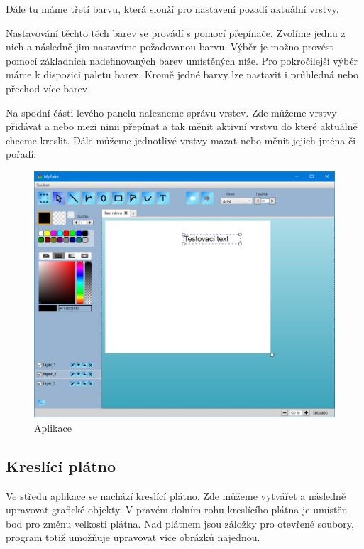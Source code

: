 \documentclass[
  field=inf,
  biblatex,
  glossaries,
  index
]{kidiplom}
\begin{document}
Dále tu máme třetí barvu, která slouží pro nastavení pozadí aktuální vrstvy.

Nastavování těchto těch barev se provádí s pomocí přepínače. Zvolíme jednu z nich a následně jim nastavíme požadovanou barvu. Výběr je možno provést pomocí základních nadefinovaných barev umístěných níže. Pro pokročilejší výběr máme k dispozici paletu barev. Kromě jedné barvy lze nastavit i průhledná nebo přechod více barev.

Na spodní části levého panelu nalezneme správu vrstev. Zde můžeme vrstvy přidávat a nebo mezi nimi přepínat a tak měnit aktivní vrstvu do které aktuálně chceme kreslit. Dále můžeme jednotlivé vrstvy mazat nebo měnit jejich jména či pořadí.

\begin{figure}
\includegraphics[width=15cm]{img/program}
\caption{Aplikace}
\end{figure}  

\subsection{Kreslící plátno}

Ve středu aplikace se nachází kreslící plátno. Zde můžeme vytvářet a následně upravovat grafické objekty. V pravém dolním rohu kreslícího plátna je umístěn bod pro změnu velkosti plátna. Nad plátnem jsou záložky pro otevřené soubory, program totiž umožňuje upravovat více obrázků najednou.
\end{document}
